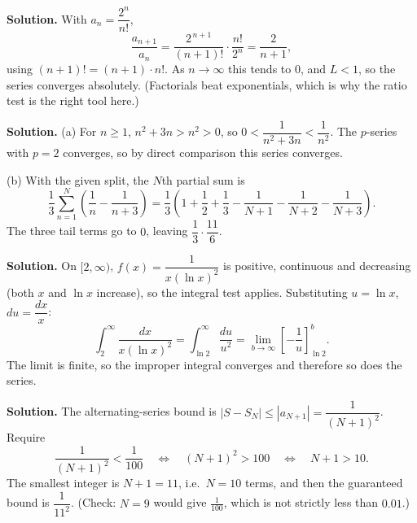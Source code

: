 \documentclass[12pt]{article}
\begin{document}


\textbf{Solution.} With $a_{n}=\dfrac{2^{n}}{n!}$,
\[
\frac{a_{n+1}}{a_{n}}=\frac{2^{\,n+1}}{(n+1)!}\cdot\frac{n!}{2^{n}}=\frac{2}{n+1},
\]
using $(n+1)!=(n+1)\cdot n!$. As $n\to\infty$ this tends to $0$, and $L<1$, so the series converges absolutely. (Factorials beat exponentials, which is why the ratio test is the right tool here.)



\textbf{Solution.} (a) For $n\ge 1$, $n^{2}+3n>n^{2}>0$, so $0<\dfrac{1}{n^{2}+3n}<\dfrac{1}{n^{2}}$. The $p$-series with $p=2$ converges, so by direct comparison this series converges.
\par
(b) With the given split, the $N$th partial sum is
\[
\frac{1}{3}\sum_{n=1}^{N}\left(\frac{1}{n}-\frac{1}{n+3}\right)
=\frac{1}{3}\left(1+\frac{1}{2}+\frac{1}{3}-\frac{1}{N+1}-\frac{1}{N+2}-\frac{1}{N+3}\right).
\]
The three tail terms go to $0$, leaving $\dfrac{1}{3}\cdot\dfrac{11}{6}$.



\textbf{Solution.} On $[2,\infty)$, $f(x)=\dfrac{1}{x(\ln x)^{2}}$ is positive, continuous and decreasing (both $x$ and $\ln x$ increase), so the integral test applies. Substituting $u=\ln x$, $du=\dfrac{dx}{x}$:
\[
\int_{2}^{\infty}\frac{dx}{x(\ln x)^{2}}
=\int_{\ln 2}^{\infty}\frac{du}{u^{2}}
=\lim_{b\to\infty}\left[-\frac{1}{u}\right]_{\ln 2}^{b}.
\]
The limit is finite, so the improper integral converges and therefore so does the series.



\textbf{Solution.} The alternating-series bound is $|S-S_{N}|\le|a_{N+1}|=\dfrac{1}{(N+1)^{2}}$. Require
\[
\frac{1}{(N+1)^{2}}<\frac{1}{100}\quad\Longleftrightarrow\quad (N+1)^{2}>100\quad\Longleftrightarrow\quad N+1>10 .
\]
The smallest integer is $N+1=11$, i.e.\ $N=10$ terms, and then the guaranteed bound is $\dfrac{1}{11^{2}}$. (Check: $N=9$ would give $\tfrac{1}{100}$, which is not strictly less than $0.01$.)
\end{document}
